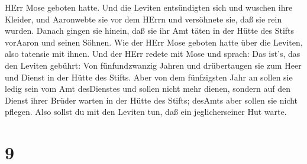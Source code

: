 HErr Mose geboten hatte.  Und die Leviten entsündigten sich
und wuschen ihre Kleider, und Aaronwebte sie vor dem HErrn und
versöhnete sie, daß sie rein wurden.  Danach gingen sie
hinein, daß sie ihr Amt täten in der Hütte des Stifts vorAaron und
seinen Söhnen. Wie der HErr Mose geboten hatte über die Leviten, also
tatensie mit ihnen.  Und der HErr redete mit Mose und
sprach:  Das ist's, das den Leviten gebührt: Von
fünfundzwanzig Jahren und drübertaugen sie zum Heer und Dienst in der
Hütte des Stifts.  Aber von dem fünfzigsten Jahr an sollen
sie ledig sein vom Amt desDienstes und sollen nicht mehr dienen,
 sondern auf den Dienst ihrer Brüder warten in der Hütte
des Stifts; desAmts aber sollen sie nicht pflegen. Also sollst du mit
den Leviten tun, daß ein jeglicherseiner Hut warte.

\hypertarget{section-8}{%
\section{9}\label{section-8}}

